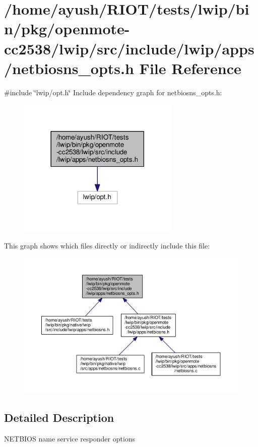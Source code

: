 \hypertarget{openmote-cc2538_2lwip_2src_2include_2lwip_2apps_2netbiosns__opts_8h}{}\section{/home/ayush/\+R\+I\+O\+T/tests/lwip/bin/pkg/openmote-\/cc2538/lwip/src/include/lwip/apps/netbiosns\+\_\+opts.h File Reference}
\label{openmote-cc2538_2lwip_2src_2include_2lwip_2apps_2netbiosns__opts_8h}
{\ttfamily \#include \char`\"{}lwip/opt.\+h\char`\"{}}\newline
Include dependency graph for netbiosns\+\_\+opts.\+h\+:
\nopagebreak
\begin{figure}[H]
\begin{center}
\leavevmode
\includegraphics[width=218pt]{openmote-cc2538_2lwip_2src_2include_2lwip_2apps_2netbiosns__opts_8h__incl}
\end{center}
\end{figure}
This graph shows which files directly or indirectly include this file\+:
\nopagebreak
\begin{figure}[H]
\begin{center}
\leavevmode
\includegraphics[width=350pt]{openmote-cc2538_2lwip_2src_2include_2lwip_2apps_2netbiosns__opts_8h__dep__incl}
\end{center}
\end{figure}


\subsection{Detailed Description}
N\+E\+T\+B\+I\+OS name service responder options 